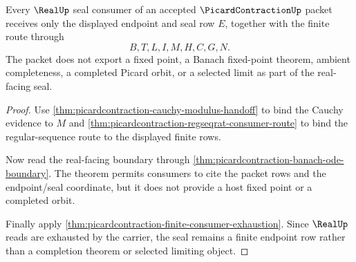\begin{theorem}
\label{thm:picardcontraction-real-seal-noncompletion}
Every $\RealUp$ seal consumer of an accepted $\PicardContractionUp$ packet receives only the displayed endpoint and seal row $E$, together with the finite route through
$$
B,T,L,I,M,H,C,G,N.
$$
The packet does not export a fixed point, a Banach fixed-point theorem, ambient completeness, a completed Picard orbit, or a selected limit as part of the real-facing seal.
\end{theorem}

\begin{proof}
Use \autoref{thm:picardcontraction-cauchy-modulus-handoff} to bind the Cauchy evidence to $M$ and \autoref{thm:picardcontraction-regseqrat-consumer-route} to bind the regular-sequence route to the displayed finite rows.

Now read the real-facing boundary through \autoref{thm:picardcontraction-banach-ode-boundary}. The theorem permits consumers to cite the packet rows and the endpoint/seal coordinate, but it does not provide a host fixed point or a completed orbit.

Finally apply \autoref{thm:picardcontraction-finite-consumer-exhaustion}. Since $\RealUp$ reads are exhausted by the carrier, the seal remains a finite endpoint row rather than a completion theorem or selected limiting object.
\end{proof}

